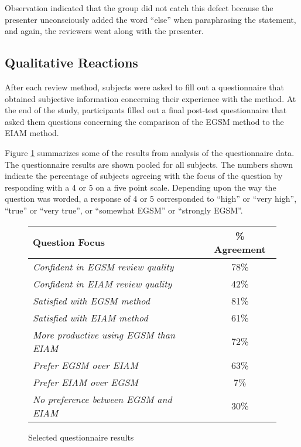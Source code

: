 Observation indicated that the group did not catch this
defect because the presenter unconsciously added the word ``else'' when
paraphrasing the statement, and again, the reviewers went along
with the presenter.  


\subsection{Qualitative Reactions}

After each review method, subjects were asked to fill out a questionnaire
that obtained subjective information concerning their experience with the 
method. At the end of the study, participants filled out a final post-test
questionnaire that asked them questions concerning the comparison of the
EGSM method to the EIAM method. 

Figure \ref{fig:quest-results} summarizes some of the
results from analysis of the questionnaire data.  The questionnaire results
are shown pooled for all subjects.  The numbers shown indicate the
percentage of subjects agreeing with the focus of the question by
responding with a 4 or 5 on a five point scale.  Depending upon the way the
question was worded, a response of 4 or 5 corresponded to ``high'' or
``very high'', ``true'' or ``very true'', or ``somewhat EGSM'' or
``strongly EGSM''.

\begin{figure}[ht]
\small
  \begin{center}
  \begin{tabular}{|l|c|}
   \hline
Question Focus                   & \% Agreement \\
   \hline
{\em Confident in EGSM review quality} & 78\% \\
{\em Confident in EIAM review quality} & 42\% \\
{\em Satisfied with EGSM method} & 81\% \\
{\em Satisfied with EIAM method} & 61\% \\
{\em More productive using EGSM than EIAM} & 72\% \\
{\em Prefer EGSM over EIAM} & 63\% \\
{\em Prefer EIAM over EGSM} & 7\% \\
{\em No preference between EGSM and EIAM} & 30\% \\
  \hline
   \end{tabular}
  \end{center}
 \caption{Selected questionnaire results}
 \label{fig:quest-results}
\normalsize
\end{figure}

